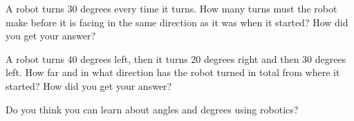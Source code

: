 \documentclass[12pt]{exam}
\begin{document}
\begin{questions}
\newpage

\question A robot turns 30 degrees every time it turns. How many turns must the robot make before it is facing in the same direction as it was when it started? How did you get your answer?

\pairspace
\pairspace
\pairspace

\question A robot turns 40 degrees left, then it turns 20 degrees right and then 30 degrees left. How far and in what direction has the robot turned in total from where it started? How did you get your answer?

\pairspace
\pairspace
\pairspace
	
\question Do you think you can learn about angles and degrees using robotics?

\end{questions}
\end{document}
